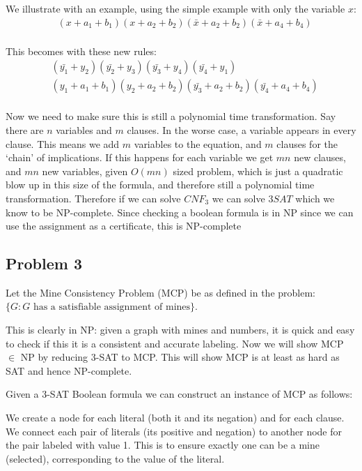 \documentclass[english]{article}
\begin{document}
We illustrate with an example, using the simple example with only the variable $x$:
\begin{align*}
& (x + a_1 + b_1)(x + a_2 + b_2)(\bar{x} + a_2 + b_2)(\bar{x} + a_4 + b_4) \\
\end{align*}

This becomes with these new rules:
\begin{align*}
& (\bar{y_1} + y_2)(\bar{y_2} + y_3)(\bar{y_3} + y_4)(\bar{y_4} + y_1) \\
& (y_1 + a_1 + b_1)(y_2 + a_2 + b_2)(\bar{y_3} + a_2 + b_2)(\bar{y_4} + a_4 + b_4) \\
\end{align*}

Now we need to make sure this is still a polynomial time transformation. Say there are $n$ variables and $m$
clauses. In the worse case, a variable appears in every clause. This means we add $m$ variables to the equation,
and $m$ clauses for the `chain' of implications. If this happens for each variable we get $mn$ new clauses, and
$mn$ new variables, given $O(mn)$ sized problem, which is just a quadratic blow up in this size of the formula,
and therefore still a polynomial time transformation. Therefore if we can solve $CNF_3$ we can solve $3SAT$ which
we know to be NP-complete. Since checking a boolean formula is in NP since we can use the assignment as a 
certificate, this is NP-complete

\subsection*{Problem 3}
Let the Mine Consistency Problem (MCP) be as defined in the problem:\\
$\{G : G \text{ has a satisfiable assignment of mines}\}$.

This is clearly in NP: given a graph with mines and numbers, it is quick and easy to check if this it 
is a consistent and accurate labeling. Now we will show MCP $\in$ NP by reducing 3-SAT to MCP.
This will show MCP is at least as hard as SAT and hence NP-complete.

Given a 3-SAT Boolean formula we can construct an instance of MCP as follows:

We create a node for each literal (both it and its negation) and for each clause. We connect each
pair of literals (its positive and negation) to another node for the pair labeled with value 1. This
is to ensure exactly one can be a mine (selected), corresponding to the value of the literal.
\end{document}
